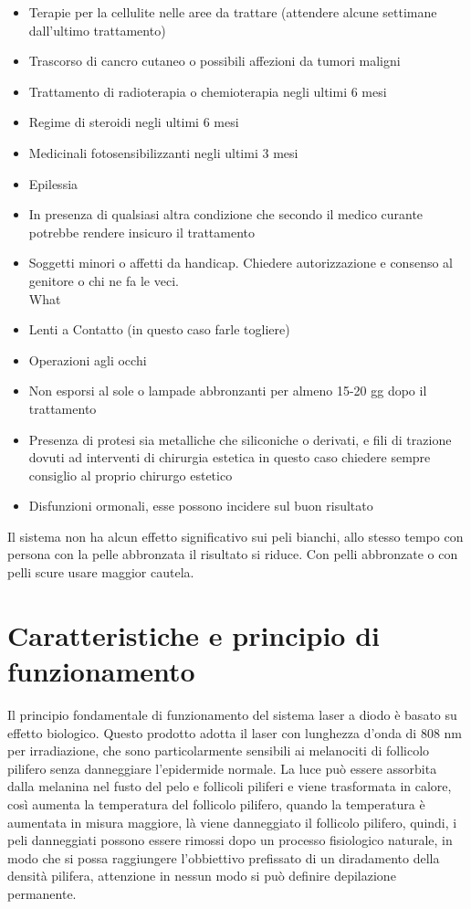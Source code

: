 \documentclass[10pt]{article}
\begin{document}
\begin{itemize}
  \item Terapie per la cellulite nelle aree da trattare (attendere alcune settimane dall'ultimo trattamento)
  \item Trascorso di cancro cutaneo o possibili affezioni da tumori maligni
  \item Trattamento di radioterapia o chemioterapia negli ultimi 6 mesi
  \item Regime di steroidi negli ultimi 6 mesi
  \item Medicinali fotosensibilizzanti negli ultimi 3 mesi
  \item Epilessia
  \item In presenza di qualsiasi altra condizione che secondo il medico curante potrebbe rendere insicuro il trattamento
  \item Soggetti minori o affetti da handicap. Chiedere autorizzazione e consenso al genitore o chi ne fa le veci.\\
What
  \item Lenti a Contatto (in questo caso farle togliere)
  \item Operazioni agli occhi
  \item Non esporsi al sole o lampade abbronzanti per almeno 15-20 gg dopo il trattamento
  \item Presenza di protesi sia metalliche che siliconiche o derivati, e fili di trazione dovuti ad interventi di chirurgia estetica in questo caso chiedere sempre consiglio al proprio chirurgo estetico
  \item Disfunzioni ormonali, esse possono incidere sul buon risultato
\end{itemize}

Il sistema non ha alcun effetto significativo sui peli bianchi, allo stesso tempo con persona con la pelle abbronzata il risultato si riduce. Con pelli abbronzate o con pelli scure usare maggior cautela.

\section{Caratteristiche e principio di funzionamento}
Il principio fondamentale di funzionamento del sistema laser a diodo è basato su effetto biologico. Questo prodotto adotta il laser con lunghezza d'onda di 808 nm per irradiazione, che sono particolarmente sensibili ai melanociti di follicolo pilifero senza danneggiare l'epidermide normale. La luce può essere assorbita dalla melanina nel fusto del pelo e follicoli piliferi e viene trasformata in calore, così aumenta la temperatura del follicolo pilifero, quando la temperatura è aumentata in misura maggiore, là viene danneggiato il follicolo pilifero, quindi, i peli danneggiati possono essere rimossi dopo un processo fisiologico naturale, in modo che si possa raggiungere l'obbiettivo prefissato di un diradamento della densità pilifera, attenzione in nessun modo si può definire depilazione permanente.
\end{document}

